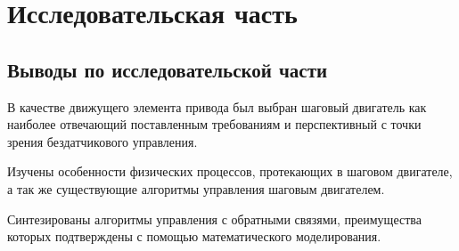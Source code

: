 \clearpage
\section{Исследовательская часть}















\clearpage
\subsection{Выводы по исследовательской части}
В качестве движущего элемента привода был выбран шаговый двигатель как наиболее
отвечающий поставленным требованиям и перспективный с точки зрения бездатчикового
управления.

Изучены особенности физических процессов, протекающих в шаговом двигателе, а так же
существующие алгоритмы управления шаговым двигателем.

Синтезированы алгоритмы управления с обратными связями, преимущества которых
подтверждены с помощью математического моделирования.
